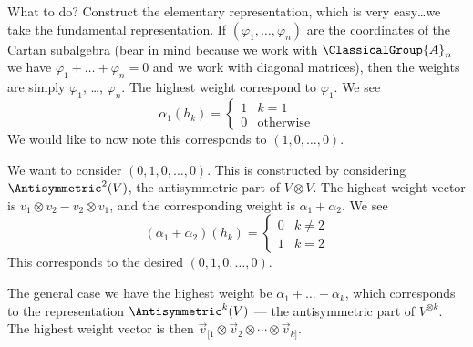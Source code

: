 What to do? Construct the elementary representation, which is
very easy\dots we take the fundamental representation. If
$(\varphi_{1},\dots,\varphi_{n})$ are the coordinates of the
Cartan subalgebra (bear in mind because we work with
$\ClassicalGroup{A}_{n}$ we have
$\varphi_{1}+\dots+\varphi_{n}=0$ and we work with diagonal
matrices), then the weights are simply $\varphi_{1}$, \dots,
$\varphi_{n}$. The highest weight correspond to $\varphi_{1}$. We
see
\begin{equation}
\alpha_{1}(h_{k}) = \begin{cases}1 & k=1\\
0 & \text{otherwise}
\end{cases}
\end{equation}
We would like to now note this corresponds to $(1,0,\dots,0)$.

We want to consider $(0,1,0,\dots,0)$. This is constructed by
considering $\Antisymmetric^{2}(V)$, the antisymmetric part of
$V\otimes V$. The highest weight vector is $v_{1}\otimes
v_{2}-v_{2}\otimes v_{1}$, and the corresponding weight is
$\alpha_{1}+\alpha_{2}$. We see
\begin{equation}
(\alpha_{1}+\alpha_{2})(h_{k})=\begin{cases}0 & k\not=2\\
1 & k=2
\end{cases}
\end{equation}
This corresponds to the desired $(0,1,0,\dots,0)$.

The general case we have the highest weight be
$\alpha_{1}+\dots+\alpha_{k}$, which corresponds to the
representation $\Antisymmetric^{k}(V)$ --- the antisymmetric part
of $V^{\otimes k}$. The highest weight vector is then $\vec{v}_{[1}\otimes\vec{v}_{2}\otimes\cdots\otimes\vec{v}_{k]}$.
